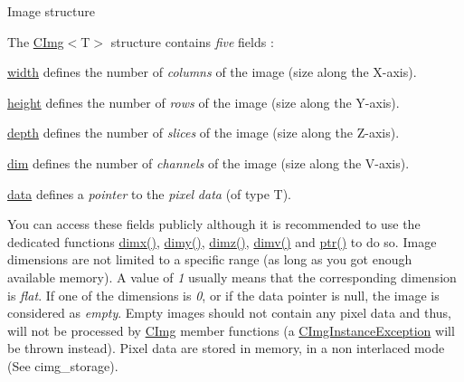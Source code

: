 \begin{DoxyParagraph}{Image structure}

\end{DoxyParagraph}
The \hyperlink{structcimg__library_1_1_c_img}{CImg}$<${\ttfamily T$>$} structure contains {\itshape five\/} fields :
\begin{DoxyItemize}
\item \hyperlink{structcimg__library_1_1_c_img_a5fb74a7776210bb99fd6755319ade13f}{width} defines the number of {\itshape columns\/} of the image (size along the X-\/axis).
\item \hyperlink{structcimg__library_1_1_c_img_a30d575fd18ae525e507315de71b4806a}{height} defines the number of {\itshape rows\/} of the image (size along the Y-\/axis).
\item \hyperlink{structcimg__library_1_1_c_img_a982d5d1e153477adf7f851106fe8ee3a}{depth} defines the number of {\itshape slices\/} of the image (size along the Z-\/axis).
\item \hyperlink{structcimg__library_1_1_c_img_ac9648dfe0a26d58e6e0030a3dbca234e}{dim} defines the number of {\itshape channels\/} of the image (size along the V-\/axis).
\item \hyperlink{structcimg__library_1_1_c_img_a54f252b86f19b2217aef3ec9e1e2e013}{data} defines a {\itshape pointer\/} to the {\itshape pixel\/} {\itshape data\/} (of type {\ttfamily T}).
\end{DoxyItemize}

You can access these fields publicly although it is recommended to use the dedicated functions \hyperlink{structcimg__library_1_1_c_img_abf1a3c383880a20428b2ea9d22f3c06e}{dimx()}, \hyperlink{structcimg__library_1_1_c_img_aa1e128f9d950b39ed312eb368741970c}{dimy()}, \hyperlink{structcimg__library_1_1_c_img_aba56e96a615d71ed9a71009768fc4b75}{dimz()}, \hyperlink{structcimg__library_1_1_c_img_ad30f8300f32a94a80e1e06c84a45de49}{dimv()} and \hyperlink{structcimg__library_1_1_c_img_af19c37d44b9fce37ad7c4a9ad247d1a0}{ptr()} to do so. Image dimensions are not limited to a specific range (as long as you got enough available memory). A value of {\itshape 1\/} usually means that the corresponding dimension is {\itshape flat\/}. If one of the dimensions is {\itshape 0\/}, or if the data pointer is null, the image is considered as {\itshape empty\/}. Empty images should not contain any pixel data and thus, will not be processed by \hyperlink{structcimg__library_1_1_c_img}{CImg} member functions (a \hyperlink{structcimg__library_1_1_c_img_instance_exception}{CImgInstanceException} will be thrown instead). Pixel data are stored in memory, in a non interlaced mode (See cimg\_\-storage).

